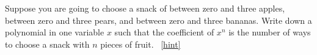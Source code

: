 \documentclass{book}
\begin{document}
\setcounter{project}{241}
\addtocounter{project}{-1}
\begin{activity}[]\label{activity-234}
\hypertarget{p-1310}{}%
Suppose you are going to choose a snack of between zero and three apples, between zero and three pears, and between zero and three bananas. Write down a polynomial in one variable \(x\) such that the coefficient of \(x^n\) is the number of ways to choose a snack with \(n\) pieces of fruit.%
~\hfill{\tiny\hyperlink{a-241}{[hint]}\hypertarget{q-241}{}}\end{activity}
\end{document}
